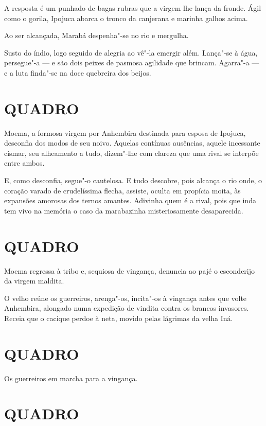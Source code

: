 A resposta é um punhado de bagas rubras que a virgem lhe lança da
fronde. Ágil como o gorila, Ipojuca abarca o tronco da canjerana e
marinha galhos acima.

Ao ser alcançada, Marabá despenha"-se no rio e mergulha.

Susto do índio, logo seguido de alegria ao vê"-la emergir além. Lança"-se
à água, persegue"-a --- e são dois peixes de pasmosa agilidade que
brincam. Agarra"-a --- e a luta finda"-se na doce quebreira dos beijos.

\section*{QUADRO}

Moema, a formosa virgem por Anhembira destinada para esposa de Ipojuca,
desconfia dos modos de seu noivo. Aquelas contínuas ausências, aquele
incessante cismar, seu alheamento a tudo, dizem"-lhe com clareza que uma
rival se interpõe entre ambos.

E, como desconfia, segue"-o cautelosa. E tudo descobre, pois alcança o
rio onde, o coração varado de crudelíssima flecha, assiste, oculta em
propícia moita, às expansões amorosas dos ternos amantes. Adivinha quem
é a rival, pois que inda tem vivo na memória o caso da marabazinha
misteriosamente desaparecida.

\section*{QUADRO}

Moema regressa à tribo e, sequiosa de vingança, denuncia ao pajé o
esconderijo da virgem maldita.

O velho reúne os guerreiros, arenga"-os, incita"-os à vingança antes que
volte Anhembira, alongado numa expedição de vindita contra os brancos
invasores. Receia que o cacique perdoe à neta, movido pelas lágrimas da
velha Iná.

\section*{QUADRO}

Os guerreiros em marcha para a vingança.

\section*{QUADRO}


